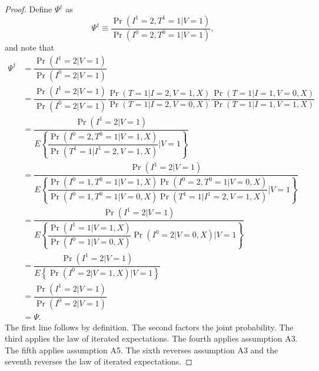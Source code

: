 \begin{appendix}
    \begin{proof}
        Define $\Psi^\dagger$ as 
        \begin{equation*}
            \Psi^\dagger \equiv  \dfrac{\Pr(I^1=2, T^1 = 1|V=1)}{\Pr(I^0=2, T^0 = 1|V=1)},
        \end{equation*}
        and note that
        \begin{align*}
            \Psi^\dagger &= \dfrac{\Pr(I^1=2|V=1)}{\Pr(I^0=2|V=1)} \\
            &= \dfrac{\Pr(I^1=2|V=1)}{\Pr(I^0=2|V=1)} \dfrac{\Pr(T = 1 | I = 2, V = 1, X)}{\Pr(T = 1 | I = 2, V = 0, X)}\dfrac{\Pr(T = 1 | I = 1, V = 0, X)}{\Pr(T = 1 | I = 1, V = 1, X)}\\
            & = \dfrac{\Pr(I^1 = 2 | V = 1)}{E\left\{\dfrac{\Pr(I^0 = 2, T^0 = 1 | V = 1, X)}{\Pr(T^1 = 1 | I^1 = 2, V = 1, X)}  \bigg| V = 1\right\}} \\
            & = \dfrac{\Pr(I^1 = 2 | V = 1)}{E\left\{\dfrac{\Pr(I^0 = 1, T^0 = 1 | V = 1, X)\Pr(I^0 = 2, T^0 = 1 | V = 0, X)}{\Pr(I^0 = 1, T^0 = 1 | V = 0, X)\Pr(T^1 = 1 | I^1 = 2, V = 1, X)}  \bigg| V = 1\right\}} \\
            & = \dfrac{\Pr(I^1 = 2 | V = 1)}{E\left\{\dfrac{\Pr(I^1 = 1 | V = 1, X)}{\Pr(I^0 = 1 | V = 0, X)}\Pr(I^0 = 2 | V = 0, X)  \bigg| V = 1\right\}} \\
            & = \dfrac{\Pr(I^1 = 2 | V = 1)}{E\left\{\Pr(I^0 = 2 | V = 1, X)  \bigg| V = 1\right\}} \\
            & = \dfrac{\Pr(I^1 = 2 | V = 1)}{\Pr(I^0 = 2 | V = 1)} \\
            &= \Psi.
        \end{align*}
        The first line follows by definition. The second factors the joint probability. The third applies the law of iterated expectations. The fourth applies assumption A3. The fifth applies assumption A5. The sixth reverses assumption A3 and the seventh reverses the law of iterated expectations. 
    

\end{proof}
\end{appendix}
